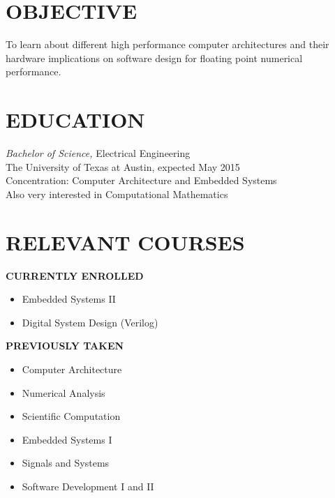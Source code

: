 \documentclass[margin]{res}
\begin{document}
\begin{resume}
  \section{OBJECTIVE} 
  To learn about different high performance computer architectures and
  their hardware implications on software design for floating point
  numerical performance.
  \section{EDUCATION} 
  {\sl Bachelor of Science,} Electrical Engineering \\
  The University of Texas at Austin,
  expected May 2015 \\
  Concentration: Computer Architecture and Embedded Systems\\
  Also very interested in Computational Mathematics
  \section{RELEVANT COURSES}
{\footnotesize\textbf{CURRENTLY ENROLLED}}
\vspace{-.75em}
\begin{multicols}{2}
  \begin{itemize}
  \item Embedded Systems II
  \item Digital System Design (Verilog)
  \end{itemize}
\end{multicols}
\vspace{-1.5em}
{\footnotesize\textbf{PREVIOUSLY TAKEN}}
\vspace{-.75em}
  \begin{multicols}{2}
    \begin{itemize}
    \item Computer Architecture
    \item Numerical Analysis
    \item Scientific Computation
    \item Embedded Systems I
    \item Signals and Systems
    \item Software Development I and II
    \end{itemize}
  \end{multicols}


\end{resume}
\end{document}
